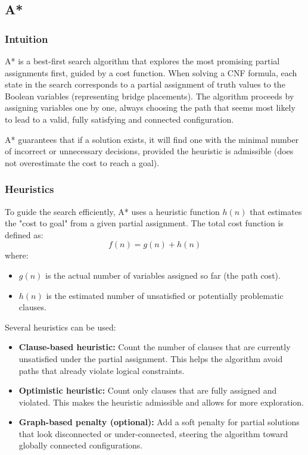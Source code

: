 \subsection{A*}

\subsubsection{Intuition}
A* is a best-first search algorithm that explores the most promising partial assignments first, guided by a cost function. When solving a CNF formula, each state in the search corresponds to a partial assignment of truth values to the Boolean variables (representing bridge placements). The algorithm proceeds by assigning variables one by one, always choosing the path that seems most likely to lead to a valid, fully satisfying and connected configuration.

A* guarantees that if a solution exists, it will find one with the minimal number of incorrect or unnecessary decisions, provided the heuristic is admissible (does not overestimate the cost to reach a goal).

\subsubsection{Heuristics}
To guide the search efficiently, A* uses a heuristic function $h(n)$ that estimates the "cost to goal" from a given partial assignment. The total cost function is defined as:
\[
f(n) = g(n) + h(n)
\]
where:
\begin{itemize}
  \item $g(n)$ is the actual number of variables assigned so far (the path cost).
  \item $h(n)$ is the estimated number of unsatisfied or potentially problematic clauses.
\end{itemize}

Several heuristics can be used:

\begin{itemize}
  \item \textbf{Clause-based heuristic:} Count the number of clauses that are currently unsatisfied under the partial assignment. This helps the algorithm avoid paths that already violate logical constraints.

  \item \textbf{Optimistic heuristic:} Count only clauses that are fully assigned and violated. This makes the heuristic admissible and allows for more exploration.

  \item \textbf{Graph-based penalty (optional):} Add a soft penalty for partial solutions that look disconnected or under-connected, steering the algorithm toward globally connected configurations.
\end{itemize}


